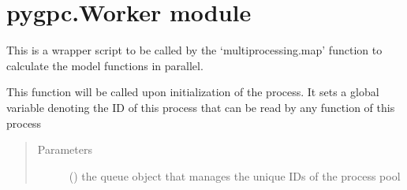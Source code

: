 \documentclass[letterpaper,10pt,english,openany,oneside]{sphinxmanual}
\begin{document}
\section{pygpc.Worker module}
\label{\detokenize{pygpc:module-pygpc.Worker}}\label{\detokenize{pygpc:pygpc-worker-module}}

\begin{fulllineitems}
\label{\detokenize{pygpc:pygpc.Worker.init}}
This is a wrapper script to be called by the ‘multiprocessing.map’ function
to calculate the model functions in parallel.

This function will be called upon initialization of the process.
It sets a global variable denoting the ID of this process that can
be read by any function of this process
\begin{quote}\begin{description}
\item[{Parameters}] \leavevmode
{} () \textendash{} the queue object that manages the unique IDs of the process pool

\end{description}\end{quote}

\end{fulllineitems}

\end{document}
